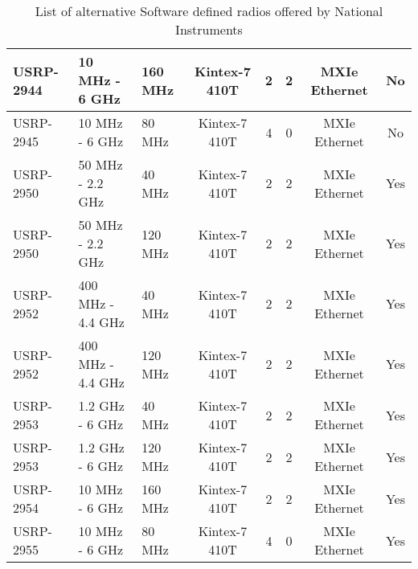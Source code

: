 \begin{landscape}
\begin{table}[!htb]
\begin{center}
\begin{tabular}{|l|l|l|c|c|c|c|c|}
                USRP-2944      & 10 MHz - 6 GHz              & 160 MHz                               & Kintex-7 410T & 2               & 2                & MXIe Ethernet          & No                     \\ \hline
                USRP-2945      & 10 MHz - 6 GHz              & 80 MHz                                & Kintex-7 410T & 4               & 0                & MXIe Ethernet          & No                     \\ \hline
                USRP-2950      & 50 MHz - 2.2 GHz            & 40 MHz                                & Kintex-7 410T & 2               & 2                & MXIe Ethernet          & Yes                    \\ \hline
                USRP-2950      & 50 MHz - 2.2 GHz            & 120 MHz                               & Kintex-7 410T & 2               & 2                & MXIe Ethernet          & Yes                    \\ \hline
                USRP-2952      & 400 MHz - 4.4 GHz           & 40 MHz                                & Kintex-7 410T & 2               & 2                & MXIe Ethernet          & Yes                    \\ \hline
                USRP-2952      & 400 MHz - 4.4 GHz           & 120 MHz                               & Kintex-7 410T & 2               & 2                & MXIe Ethernet          & Yes                    \\ \hline
                USRP-2953      & 1.2 GHz - 6 GHz             & 40 MHz                                & Kintex-7 410T & 2               & 2                & MXIe Ethernet          & Yes                    \\ \hline
                USRP-2953      & 1.2 GHz - 6 GHz             & 120 MHz                               & Kintex-7 410T & 2               & 2                & MXIe Ethernet          & Yes                    \\ \hline
                USRP-2954      & 10 MHz - 6 GHz              & 160 MHz                               & Kintex-7 410T & 2               & 2                & MXIe Ethernet          & Yes                    \\ \hline
                USRP-2955      & 10 MHz - 6 GHz              & 80 MHz                                & Kintex-7 410T & 4               & 0                & MXIe Ethernet          & Yes                    \\ \hline
                \end{tabular}
            \end{center}
            \caption{List of alternative Software defined radios offered by National Instruments}
            \label{tb:USRPPartsList}
        \end{table}
\end{landscape}
\clearpage%

